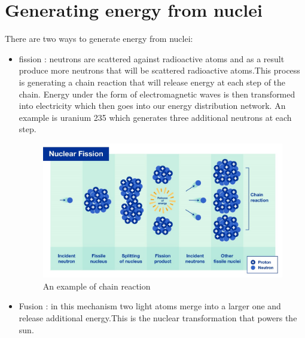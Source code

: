 \documentclass{article}
\begin{document}
\section{Generating energy from nuclei}
There are two ways to generate energy from nuclei:
\begin{itemize}
    \item fission : neutrons are scattered against radioactive atoms and as a result produce more neutrons that will be scattered radioactive atoms.This process is generating a chain reaction that will release energy at each step of the chain. Energy under the form of electromagnetic waves is then transformed into electricity which then goes into our energy distribution network. An example is uranium 235 which generates three additional neutrons at each step.
\begin{figure}
    \centering
    \includegraphics[width=\linewidth]{IAF.jpeg}
    \caption{An example of chain reaction\protect\footnotemark}
    \label{fig:enter-label}
\end{figure}


\item Fusion : in this mechanism two light atoms merge into a larger one and release additional energy.This is the  nuclear transformation that powers the sun.
\end{itemize}
\end{document}
